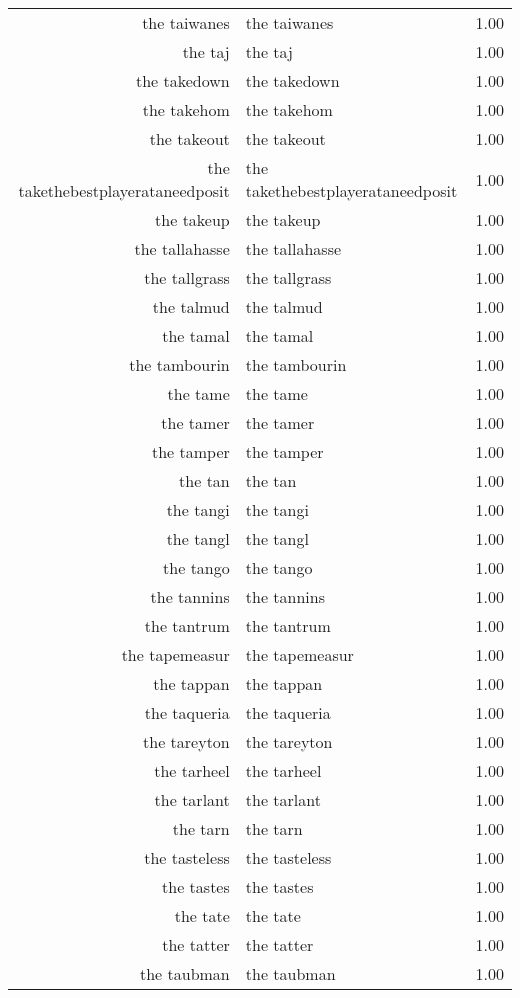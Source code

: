 \begin{table}[ht]
\begin{tabular}{rlr}
  the taiwanes & the taiwanes & 1.00 \\ 
  the taj & the taj & 1.00 \\ 
  the takedown & the takedown & 1.00 \\ 
  the takehom & the takehom & 1.00 \\ 
  the takeout & the takeout & 1.00 \\ 
  the takethebestplayerataneedposit & the takethebestplayerataneedposit & 1.00 \\ 
  the takeup & the takeup & 1.00 \\ 
  the tallahasse & the tallahasse & 1.00 \\ 
  the tallgrass & the tallgrass & 1.00 \\ 
  the talmud & the talmud & 1.00 \\ 
  the tamal & the tamal & 1.00 \\ 
  the tambourin & the tambourin & 1.00 \\ 
  the tame & the tame & 1.00 \\ 
  the tamer & the tamer & 1.00 \\ 
  the tamper & the tamper & 1.00 \\ 
  the tan & the tan & 1.00 \\ 
  the tangi & the tangi & 1.00 \\ 
  the tangl & the tangl & 1.00 \\ 
  the tango & the tango & 1.00 \\ 
  the tannins & the tannins & 1.00 \\ 
  the tantrum & the tantrum & 1.00 \\ 
  the tapemeasur & the tapemeasur & 1.00 \\ 
  the tappan & the tappan & 1.00 \\ 
  the taqueria & the taqueria & 1.00 \\ 
  the tareyton & the tareyton & 1.00 \\ 
  the tarheel & the tarheel & 1.00 \\ 
  the tarlant & the tarlant & 1.00 \\ 
  the tarn & the tarn & 1.00 \\ 
  the tasteless & the tasteless & 1.00 \\ 
  the tastes & the tastes & 1.00 \\ 
  the tate & the tate & 1.00 \\ 
  the tatter & the tatter & 1.00 \\ 
  the taubman & the taubman & 1.00 \\ 

\end{tabular}
\end{table}
